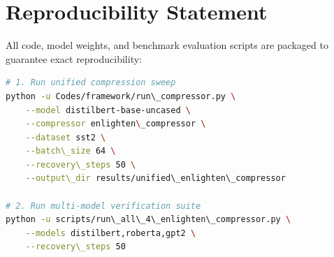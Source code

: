 \section{Reproducibility Statement}
All code, model weights, and benchmark evaluation scripts are packaged to guarantee exact reproducibility:
\begin{lstlisting}[language=bash]
# 1. Run unified compression sweep
python -u Codes/framework/run\_compressor.py \
    --model distilbert-base-uncased \
    --compressor enlighten\_compressor \
    --dataset sst2 \
    --batch\_size 64 \
    --recovery\_steps 50 \
    --output\_dir results/unified\_enlighten\_compressor

# 2. Run multi-model verification suite
python -u scripts/run\_all\_4\_enlighten\_compressor.py \
    --models distilbert,roberta,gpt2 \
    --recovery\_steps 50
\end{lstlisting}
